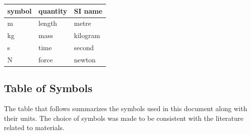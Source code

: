 \documentclass[12pt]{article}
\begin{document}
\renewcommand{\arraystretch}{1.2}
  \noindent \begin{tabular}{l l l}
  \toprule
  \textbf{symbol} & \textbf{quantity} & \textbf{SI name}\\
  \midrule
  \si{\metre} & length & metre\\
  \si{\kilogram} & mass & kilogram\\
  \si{\second} & time & second\\
  \si{\newton} & force & newton\\
  \bottomrule
  \end{tabular}

\subsection{Table of Symbols}

The table that follows summarizes the symbols used in this document along with
their units.
The choice of symbols was made to be consistent with the literature related to materials.
\end{document}
